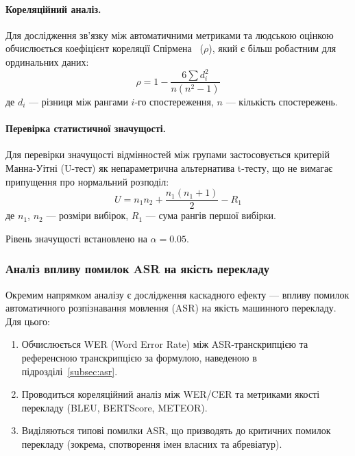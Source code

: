 \paragraph{Кореляційний аналіз.}
Для дослідження зв'язку між автоматичними метриками та людською оцінкою
обчислюється коефіцієнт кореляції Спірмена~\cite{spearman} ($\rho$),
який є більш робастним для ординальних даних:
\begin{equation}
\rho = 1 - \frac{6 \sum d_i^2}{n(n^2 - 1)}
\end{equation}
де $d_i$ — різниця між рангами $i$-го спостереження, $n$ — кількість
спостережень.

\paragraph{Перевірка статистичної значущості.}
Для перевірки значущості відмінностей між групами застосовується критерій
Манна-Уітні (U-тест) як непараметрична альтернатива t-тесту, що не вимагає
припущення про нормальний розподіл:
\begin{equation}
U = n_1 n_2 + \frac{n_1(n_1 + 1)}{2} - R_1
\end{equation}
де $n_1$, $n_2$ — розміри вибірок, $R_1$ — сума рангів першої вибірки.

Рівень значущості встановлено на $\alpha = 0.05$.

\subsubsection{Аналіз впливу помилок ASR на якість перекладу}

Окремим напрямком аналізу є дослідження каскадного ефекту — впливу помилок
автоматичного розпізнавання мовлення (ASR) на якість машинного перекладу.
Для цього:

\begin{enumerate}
    \item Обчислюється WER (Word Error Rate) між ASR-транскрипцією та
    референсною транскрипцією за формулою, наведеною в підрозділі~\ref{subsec:asr}.

    \item Проводиться кореляційний аналіз між WER/CER та метриками якості
    перекладу (BLEU, BERTScore, METEOR).

    \item Виділяються типові помилки ASR, що призводять до критичних
    помилок перекладу (зокрема, спотворення імен власних та абревіатур).
\end{enumerate}

